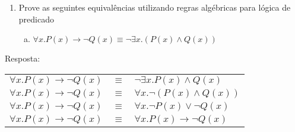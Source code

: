 \documentclass[aspectratio=43]{beamer}
\begin{document}
\begin{frame}%
	\begin{enumerate}[1.]
		\item Prove as seguintes equival\^encias utilizando regras alg\'ebricas para l\'ogica de predicado

	\begin{enumerate}[a)]
		
		\item $\forall x.P(x)\to\neg Q(x) \equiv \neg\exists x.(P(x)\land Q(x))$ \\
		
	\end{enumerate}
	
	\end{enumerate}
	Resposta:
	\\
	\centering
	\pause
	
	\begin{tabular}{rcl}
		$\forall x.P(x)\to\neg Q(x)$ & $\equiv$ & $\neg\exists x.P(x)\land Q(x)$\\
		\pause
		$\forall x.P(x)\to\neg Q(x)$ & $\equiv$ & $\forall x.\neg (P(x)\land Q(x))$ \\
		\pause
		$\forall x.P(x)\to\neg Q(x)$ & $\equiv$ & $\forall x.\neg P(x)\lor \neg Q(x)$ \\
		\pause
		$\forall x.P(x)\to\neg Q(x)$ & $\equiv$ & $\forall x.P(x)\to \neg Q(x)$ 
	\end{tabular}
	
	
\end{frame}
\end{document}
